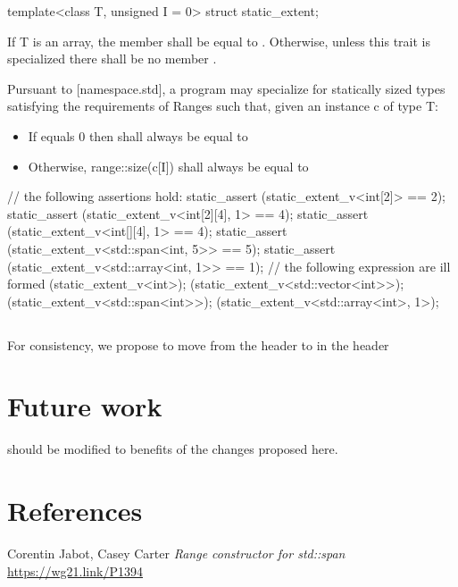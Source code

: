 \documentclass{wg21}
\begin{document}
\begin{itemdecl}
template<class T, unsigned I = 0>
struct static_extent;
\end{itemdecl}
\begin{itemdescr}
	\pnum
	If T is an array, the member  shall be equal to .
	Otherwise, unless this trait is specialized there shall be no member .
	
	Pursuant to [namespace.std], a program may specialize  for statically sized types satisfying the requirements of Ranges
	such that, given an instance c of type T:
		\begin{itemize}
			\item If  equals 0 then  shall always be equal to 
			\item Otherwise, range::size(c[I]) shall always be equal to 
		\end{itemize}
	\begin{example}
	\begin{codeblock}
	// the following assertions hold:
	static_assert (static_extent_v<int[2]> == 2);
	static_assert (static_extent_v<int[2][4], 1> == 4);
	static_assert (static_extent_v<int[][4], 1> == 4);
	static_assert (static_extent_v<std::span<int, 5>> == 5);
	static_assert (static_extent_v<std::array<int, 1>> == 1);
	// the following expression are ill formed
	(static_extent_v<int>);
	(static_extent_v<std::vector<int>>);
	(static_extent_v<std::span<int>>);
	(static_extent_v<std::array<int>, 1>);		
\end{codeblock}
	\end{example}
\end{itemdescr}

\subsection{}

For consistency, 
we propose to move  from the header  \linebreak
to  in the header 

\section{Future work}

 should be modified to benefits of the changes proposed here.

\section{References}
\renewcommand{\section}[2]{}%
\begin{thebibliography}{9}
	Corentin Jabot, Casey Carter
	\emph{Range constructor for std::span}\newline
	\url{https://wg21.link/P1394}
\end{thebibliography}
\end{document}
